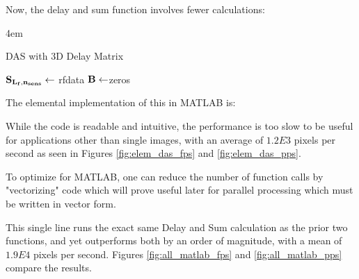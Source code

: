     Now, the delay and sum function involves fewer calculations:

    \begin{algorithm} [H]
        \parindent4em
        \normalem
        \caption{DAS with 3D Delay Matrix}\label{algo:das_3d_indmat}
            $\bf{S}_{L_f,n_{sens}} \gets$ rfdata\;
            $\bf{B} \gets $zeros\;
        \end{algorithm}

    The elemental implementation of this in MATLAB is:

    

    While the code is readable and intuitive, the performance is too slow to be useful for applications other than single images, with an average of $1.2E3$ pixels per second as seen in Figures \ref{fig:elem_das_fps} and \ref{fig:elem_das_pps}. 


    To optimize for MATLAB, one can reduce the number of function calls by "vectorizing" code which will prove useful later for parallel processing which must be written in vector form.

    

    This single line runs the exact same Delay and Sum calculation as the prior two functions, and yet outperforms both by an order of magnitude, with a mean of $1.9E4$ pixels per second. Figures \ref{fig:all_matlab_fps} and \ref{fig:all_matlab_pps} compare the results.


